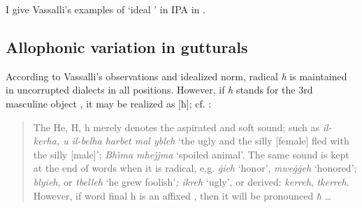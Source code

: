 \documentclass[output=paper]{langsci/langscibook}
\begin{document}
I give Vassalli's examples of ‘ideal ’ in IPA in .

\begin{table}
 \caption{Examples of Vassalli's `ideal pronunciation'}
    \label{extab:puech:10}
\end{table}


\subsection{Allophonic variation in gutturals}

According to Vassalli's observations and idealized norm, radical \textit{h} is maintained in uncorrupted dialects in all positions. However, if \textit{h} stands for the 3rd masculine object , it may be realized as [ħ]; cf. \citet[§24]{Vassalli1827}:

\begin{quote}
The He, H, h merely denotes the aspirated and soft sound; such as \textit{il- kerha, u il-belha harbet mal ybleh} ‘the ugly and the silly [female] fled with the silly [male]’; \textit{Bh\v{ı}ma mhejjma} ‘spoiled animal’. The same sound is kept at the end of words when it is radical, e.g. \textit{\.gieh} ‘honor’, \textit{mwe\.g\.geh} ‘honored’; \textit{blyieh}, or \textit{tbelleh} ‘he grew foolish’\textit{; ikreh} ‘ugly’, or derived: \textit{kerreh}, \textit{tkerreh}. However, if word final h is an affixed , then it will be pronounced \textit{ħ} …
\end{quote}
\end{document}

